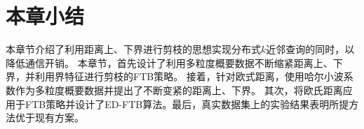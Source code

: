 \section{本章小结}\label{sec-c4-conclusion}
本章节介绍了利用距离上、下界进行剪枝的思想实现分布式$k$近邻查询的同时，以降低通信开销。
本章节，首先设计了利用多粒度概要数据不断缩紧距离上、下界，并利用界特征进行剪枝的FTB策略。
接着，针对欧式距离，使用哈尔小波系数作为多粒度概要数据并提出了不断变紧的距离上、下界。
其次，将欧氏距离应用于FTB策略并设计了ED-FTB算法。最后，真实数据集上的实验结果表明所提方法优于现有方案。

%
%
%
%
%



\clearpage
\phantom{s}
\clearpage